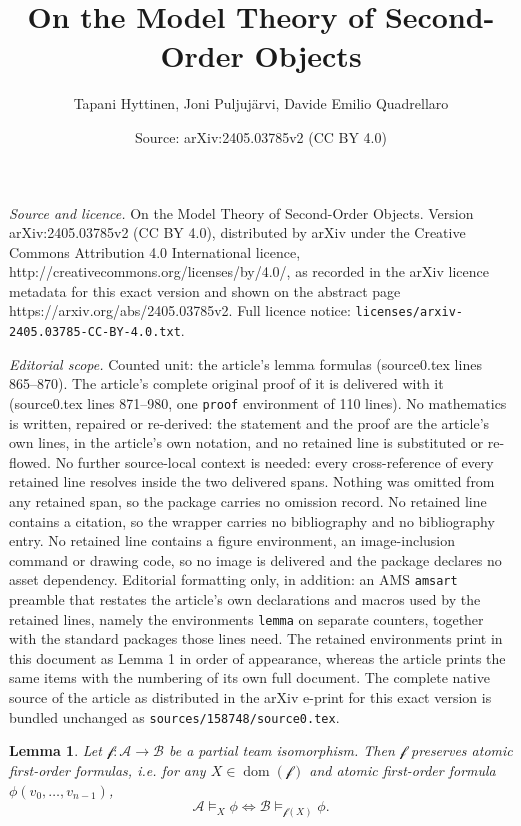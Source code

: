 \documentclass[10pt,a4paper]{amsart}
\title{On the Model Theory of Second-Order Objects}
\author{Tapani Hyttinen, Joni Puljuj\"arvi, Davide Emilio Quadrellaro}
\date{Source: arXiv:2405.03785v2 (CC BY 4.0)}
\newtheorem{lemma}{Lemma}
\newcommand{\A}{\mathcal{A}}
\newcommand{\B}{\mathcal{B}}
\DeclareMathOperator{\dom}{dom}
\newcommand{\f}{\mathcal{f}}
\begin{document}
\maketitle

\noindent\emph{Source and licence.} On the Model Theory of Second-Order Objects. Version arXiv:2405.03785v2 (CC BY 4.0), distributed by arXiv under the Creative Commons Attribution 4.0 International licence, http://creativecommons.org/licenses/by/4.0/, as recorded in the arXiv licence metadata for this exact version and shown on the abstract page https://arxiv.org/abs/2405.03785v2. Full licence notice: \texttt{licenses/arxiv-2405.03785-CC-BY-4.0.txt}.\par\smallskip

\noindent\textit{Editorial scope.} Counted unit: the article's lemma formulas (source0.tex lines 865--870). The article's complete original proof of it is delivered with it (source0.tex lines 871--980, one \texttt{proof} environment of 110 lines). No mathematics is written, repaired or re-derived: the statement and the proof are the article's own lines, in the article's own notation, and no retained line is substituted or re-flowed.  No further source-local context is needed: every cross-reference of every retained line resolves inside the two delivered spans.  Nothing was omitted from any retained span, so the package carries no omission record.  No retained line contains a citation, so the wrapper carries no bibliography and no bibliography entry.  No retained line contains a figure environment, an image-inclusion command or drawing code, so no image is delivered and the package declares no asset dependency.  Editorial formatting only, in addition: an AMS \texttt{amsart} preamble that restates the article's own declarations and macros used by the retained lines, namely the environments \texttt{lemma} on separate counters, together with the standard packages those lines need.  The retained environments print in this document as Lemma 1 in order of appearance, whereas the article prints the same items with the numbering of its own full document.  The complete native source of the article as distributed in the arXiv e-print for this exact version is bundled unchanged as \texttt{sources/158748/source0.tex}.
\begin{lemma}\label{Partial isomorphisms preserve first-order atomic formulas}
    Let $\f\colon\A\to\B$ be a partial team isomorphism. Then $\f$ preserves atomic first-order formulas, i.e. for any $X\in\dom(\f)$ and atomic first-order formula $\phi(v_0,\dots,v_{n-1})$,
    \[
        \A\models_X\phi \iff \B\models_{\f(X)}\phi.
    \]
\end{lemma}
\end{document}
